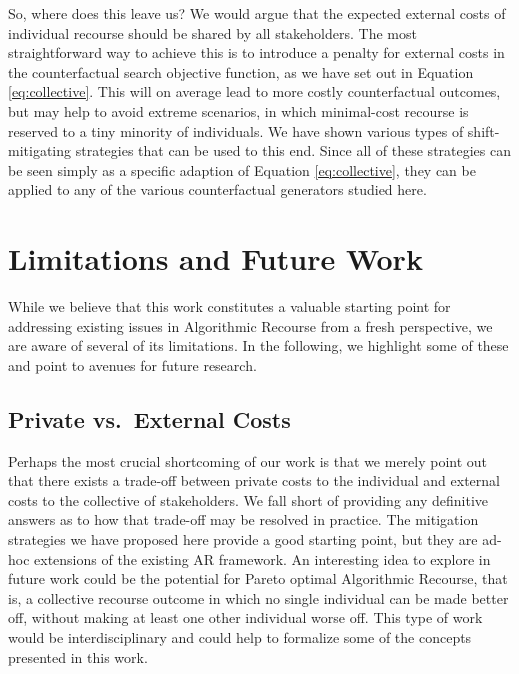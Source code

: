 \documentclass[conference,final,]{IEEEtran}
\theoremstyle{definition}
\theoremstyle{definition}
\theoremstyle{definition}
\theoremstyle{definition}
\theoremstyle{remark}
\begin{document}
So, where does this leave us? We would argue that the expected external costs of individual recourse should be shared by all stakeholders. The most straightforward way to achieve this is to introduce a penalty for external costs in the counterfactual search objective function, as we have set out in Equation \eqref{eq:collective}. This will on average lead to more costly counterfactual outcomes, but may help to avoid extreme scenarios, in which minimal-cost recourse is reserved to a tiny minority of individuals. We have shown various types of shift-mitigating strategies that can be used to this end. Since all of these strategies can be seen simply as a specific adaption of Equation \eqref{eq:collective}, they can be applied to any of the various counterfactual generators studied here.

\hypertarget{limit}{%
\section{Limitations and Future Work}\label{limit}}

While we believe that this work constitutes a valuable starting point for addressing existing issues in Algorithmic Recourse from a fresh perspective, we are aware of several of its limitations. In the following, we highlight some of these and point to avenues for future research.

\hypertarget{private-vs.-external-costs}{%
\subsection{Private vs.~External Costs}\label{private-vs.-external-costs}}

Perhaps the most crucial shortcoming of our work is that we merely point out that there exists a trade-off between private costs to the individual and external costs to the collective of stakeholders. We fall short of providing any definitive answers as to how that trade-off may be resolved in practice. The mitigation strategies we have proposed here provide a good starting point, but they are ad-hoc extensions of the existing AR framework. An interesting idea to explore in future work could be the potential for Pareto optimal Algorithmic Recourse, that is, a collective recourse outcome in which no single individual can be made better off, without making at least one other individual worse off. This type of work would be interdisciplinary and could help to formalize some of the concepts presented in this work.
\end{document}
